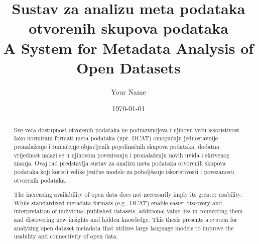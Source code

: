 \documentclass[12pt,a4paper]{report}
\title{Sustav za analizu meta podataka otvorenih skupova podataka\\
       \large A System for Metadata Analysis of Open Datasets}
\author{Your Name}
\date{\today}
\begin{document}
\frontmatter
\maketitle

\begin{abstract}
Sve veća dostupnost otvorenih podataka ne podrazumijeva i njihovu veću iskoristivost. 
Iako normirani formati meta podataka (npr. DCAT) omogućuju jednostavnije pronalaženje i 
tumačenje objavljenih pojedinačnih skupova podataka, dodatna vrijednost nalazi se u 
njihovom povezivanju i pronalaženju novih uvida i skrivenog znanja. Ovaj rad predstavlja 
sustav za analizu meta podataka otvorenih skupova podataka koji koristi velike jezične 
modele za poboljšanje iskoristivosti i povezanosti otvorenih podataka.

The increasing availability of open data does not necessarily imply its greater usability. 
While standardized metadata formats (e.g., DCAT) enable easier discovery and interpretation 
of individual published datasets, additional value lies in connecting them and discovering 
new insights and hidden knowledge. This thesis presents a system for analyzing open dataset 
metadata that utilizes large language models to improve the usability and connectivity of 
open data.
\end{abstract}

\tableofcontents
\listoffigures
\listoftables

\mainmatter









\backmatter
\printbibliography
\end{document}
